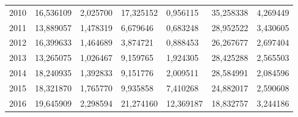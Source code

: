 \begin{table}
\begin{tabular}{p{1cm}p{2cm}p{2cm}p{2cm}p{2cm}p{2cm}p{2cm}}
 2010 &                              16,536109 &        2,025700 &        17,325152 &                  0,956115 &                  35,258338 &                        4,269449 \\
 2011 &                              13,889057 &        1,478319 &         6,679646 &                  0,683248 &                  28,952522 &                        3,430605 \\
 2012 &                              16,399633 &        1,464689 &         3,874721 &                  0,888453 &                  26,267677 &                        2,697404 \\
 2013 &                              13,265075 &        1,026467 &         9,159765 &                  1,924305 &                  28,425288 &                        2,565503 \\
 2014 &                              18,240935 &        1,392833 &         9,151776 &                  2,009511 &                  28,584991 &                        2,084596 \\
 2015 &                              18,321870 &        1,765770 &         9,935858 &                  7,410268 &                  24,882017 &                        2,590608 \\
 2016 &                              19,645909 &        2,298594 &        21,274160 &                 12,369187 &                  18,832757 &                        3,244186 \\
\bottomrule
\end{tabular}
\end{table}

